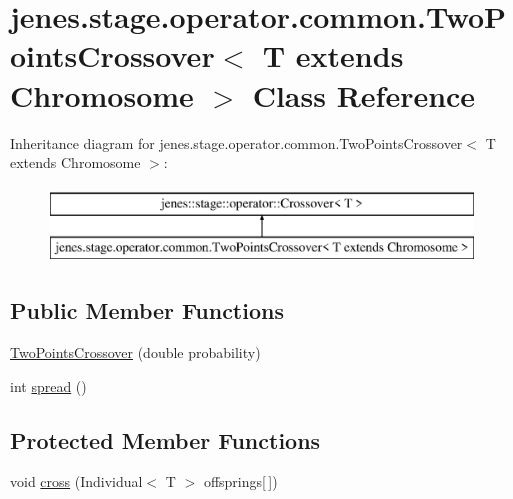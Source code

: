 \hypertarget{classjenes_1_1stage_1_1operator_1_1common_1_1_two_points_crossover_3_01_t_01extends_01_chromosome_01_4}{\section{jenes.\-stage.\-operator.\-common.\-Two\-Points\-Crossover$<$ T extends Chromosome $>$ Class Reference}
\label{classjenes_1_1stage_1_1operator_1_1common_1_1_two_points_crossover_3_01_t_01extends_01_chromosome_01_4}
}
Inheritance diagram for jenes.\-stage.\-operator.\-common.\-Two\-Points\-Crossover$<$ T extends Chromosome $>$\-:\begin{figure}[H]
\begin{center}
\leavevmode
\includegraphics[height=2.000000cm]{classjenes_1_1stage_1_1operator_1_1common_1_1_two_points_crossover_3_01_t_01extends_01_chromosome_01_4}
\end{center}
\end{figure}
\subsection*{Public Member Functions}
\begin{DoxyCompactItemize}
\item 
\hyperlink{classjenes_1_1stage_1_1operator_1_1common_1_1_two_points_crossover_3_01_t_01extends_01_chromosome_01_4_ab7fe58d08e9e9b89881661c16e80f19e}{Two\-Points\-Crossover} (double probability)
\item 
int \hyperlink{classjenes_1_1stage_1_1operator_1_1common_1_1_two_points_crossover_3_01_t_01extends_01_chromosome_01_4_a30115e5f2250765209bed48bda1e5155}{spread} ()
\end{DoxyCompactItemize}
\subsection*{Protected Member Functions}
\begin{DoxyCompactItemize}
\item 
void \hyperlink{classjenes_1_1stage_1_1operator_1_1common_1_1_two_points_crossover_3_01_t_01extends_01_chromosome_01_4_a5cf79fb6f728917f5ba48960ff6814ed}{cross} (Individual$<$ T $>$ offsprings\mbox{[}$\,$\mbox{]})
\end{DoxyCompactItemize}


